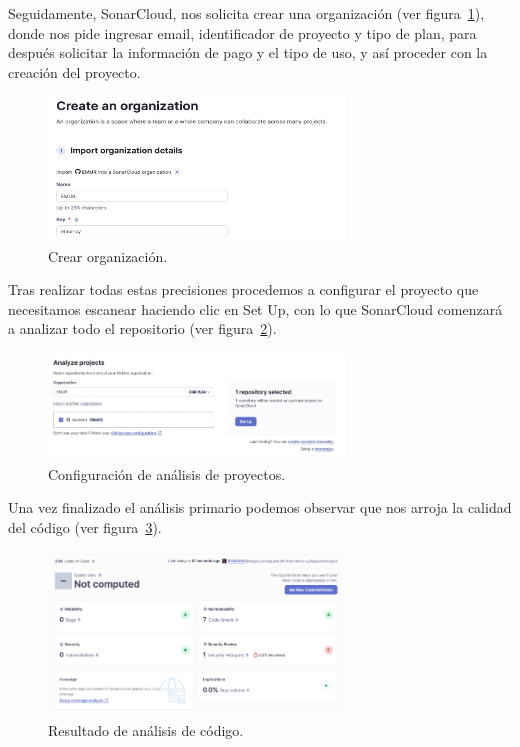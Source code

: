 Seguidamente, SonarCloud, nos solicita crear una organización (ver figura~\ref{Img:Crear+organización}), donde nos pide ingresar email, identificador de proyecto y tipo de plan, para después solicitar la información de pago y el tipo de uso, y así proceder con la creación del proyecto. 

\begin{figure}[h]
    \centering
    \includegraphics[width=0.7\textwidth]{img/infraestructura/crear-organizacion.png}
    \caption{Crear organización.} \label{Img:Crear+organización}
\end{figure} 

Tras realizar todas estas precisiones procedemos a configurar el proyecto que necesitamos escanear haciendo clic en Set Up, con lo que SonarCloud comenzará a analizar todo el repositorio (ver figura~\ref{Img:Configuración+de+análisis+de+proyectos}).

\newpage
\begin{figure}[h]
    \centering
    \includegraphics[width=0.7\textwidth]{img/infraestructura/configurar-proyecto.png}
    \caption{Configuración de análisis de proyectos.} \label{Img:Configuración+de+análisis+de+proyectos}
\end{figure} 


Una vez finalizado el análisis primario podemos observar que nos arroja la calidad del código (ver figura~\ref{Img:Resultado+de+análisis+de+código}).

\begin{figure}[h]
    \centering
    \includegraphics[width=0.7\textwidth]{img/infraestructura/calidad-de-codigo.png}
    \caption{Resultado de análisis de código.} \label{Img:Resultado+de+análisis+de+código}
\end{figure} 

